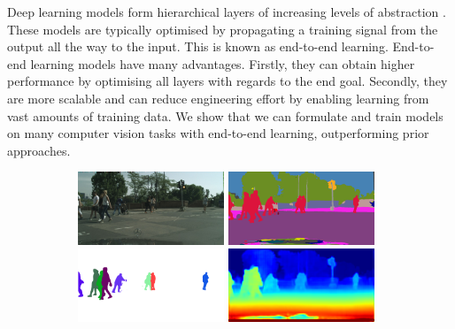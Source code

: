 Deep learning models form hierarchical layers of increasing levels of abstraction \citep{goodfellow2016deep}. These models are typically optimised by propagating a training signal from the output all the way to the input. This is known as end-to-end learning. 
End-to-end learning models have many advantages. Firstly, they can obtain higher performance by optimising all layers with regards to the end goal. Secondly, they are more scalable and can reduce engineering effort by enabling learning from vast amounts of training data. We show that we can formulate and train models on many computer vision tasks with end-to-end learning, outperforming prior approaches.

\begin{figure}[t]
\centering
    \begin{subfigure}[b]{0.65\textwidth}
\centering
        \includegraphics[width=0.48\textwidth,trim={0 20mm 0 0},clip]{segnet_114_output_0.jpg}
        \includegraphics[width=0.48\textwidth,trim={0 20mm 0 0},clip]{segnet_114_output_1.png} \\
        \includegraphics[width=0.48\textwidth,trim={0 20mm 0 0},clip]{segnet_114_output_3.png}
        \includegraphics[width=0.48\textwidth,trim={0 20mm 0 0},clip]{segnet_114_output_4.png}

\end{subfigure}
\end{figure}
